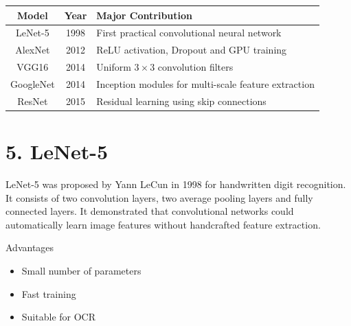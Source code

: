 \documentclass[11pt]{article}
\begin{document}
\begin{center}

\begin{tabular}{|c|c|p{7cm}|}

\hline

Model & Year & Major Contribution\\

\hline

LeNet-5 & 1998 &
First practical convolutional neural network\\

\hline

AlexNet & 2012 &
ReLU activation, Dropout and GPU training\\

\hline

VGG16 & 2014 &
Uniform $3\times3$ convolution filters\\

\hline

GoogleNet & 2014 &
Inception modules for multi-scale feature extraction\\

\hline

ResNet & 2015 &
Residual learning using skip connections\\

\hline

\end{tabular}

\end{center}


\section*{5. LeNet-5}

LeNet-5 was proposed by Yann LeCun in 1998 for handwritten digit
recognition. It consists of two convolution layers, two average pooling
layers and fully connected layers. It demonstrated that convolutional
networks could automatically learn image features without handcrafted
feature extraction.


Advantages

\begin{itemize}

\item Small number of parameters

\item Fast training

\item Suitable for OCR

\end{itemize}
\end{document}
